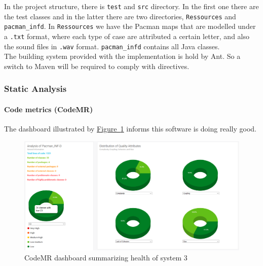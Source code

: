 \documentclass[]{article}
\newcommand{\wordlink}[2]{\hyperref[#2]{#1~\ref{#2}}}
\begin{document}
In the project structure, there is \texttt{test} and \texttt{src} directory. In the first one there are the test classes and in the latter there are two directories, \texttt{Ressources} and \texttt{pacman\_infd}. In \texttt{Ressources} we have the Pacman maps that are modelled under a \texttt{.txt} format, where each type of case are attributed a certain letter, and also the sound files in \texttt{.wav} format. \texttt{pacman\_infd} contains all Java classes.
\\

The building system provided with the implementation is hold by Ant. So a switch to Maven will be required to comply with directives.


\subsubsection{Static Analysis}

\paragraph{Code metrics (CodeMR)}

 The dashboard illustrated by \wordlink{Figure}{fig:S3_codeMR_dashboard} informs this software is doing really good.

\begin{figure}[h]
\includegraphics[width=\linewidth]{S3_codeMR_dashboard.png}
\caption{CodeMR dashboard summarizing health of system 3}
\label{fig:S3_codeMR_dashboard}
\end{figure}

\newpage
\end{document}
